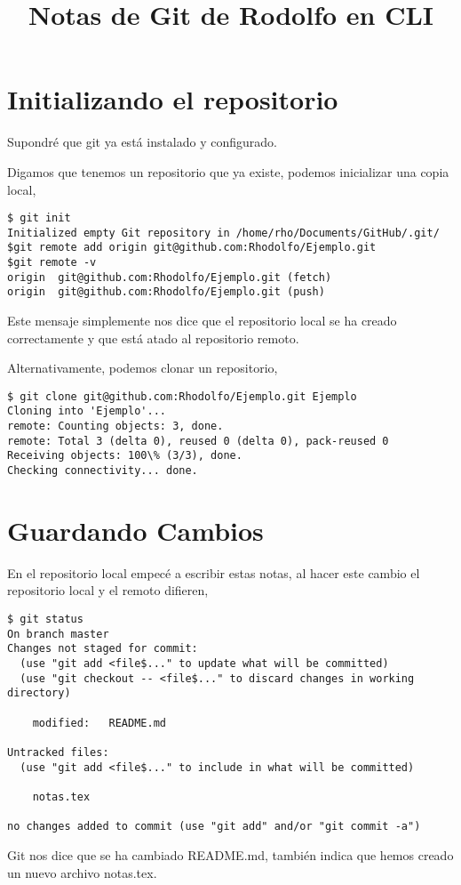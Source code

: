 \documentclass{article}
\begin{document}
\title{Notas de Git de Rodolfo en CLI}
\maketitle

\section{Initializando el repositorio}

Supondr\'{e} que git ya est\'{a} instalado y configurado.

Digamos que tenemos un repositorio que ya existe, 
podemos inicializar una copia local,
\begin{verbatim}
$ git init
Initialized empty Git repository in /home/rho/Documents/GitHub/.git/
$git remote add origin git@github.com:Rhodolfo/Ejemplo.git
$git remote -v
origin	git@github.com:Rhodolfo/Ejemplo.git (fetch)
origin	git@github.com:Rhodolfo/Ejemplo.git (push)
\end{verbatim}
Este mensaje simplemente nos dice que el repositorio local se ha creado correctamente
y que est\'{a} atado al repositorio remoto.

Alternativamente, podemos clonar un repositorio,
\begin{verbatim}
$ git clone git@github.com:Rhodolfo/Ejemplo.git Ejemplo
Cloning into 'Ejemplo'...
remote: Counting objects: 3, done.
remote: Total 3 (delta 0), reused 0 (delta 0), pack-reused 0
Receiving objects: 100\% (3/3), done.
Checking connectivity... done.
\end{verbatim}


\section{Guardando Cambios}

En el repositorio local empec\'{e} a escribir estas notas,
al hacer este cambio el repositorio local y el remoto difieren,
\begin{verbatim}
$ git status
On branch master
Changes not staged for commit:
  (use "git add <file$..." to update what will be committed)
  (use "git checkout -- <file$..." to discard changes in working directory)

	modified:   README.md

Untracked files:
  (use "git add <file$..." to include in what will be committed)

	notas.tex

no changes added to commit (use "git add" and/or "git commit -a")
\end{verbatim}
Git nos dice que se ha cambiado README.md,
tambi\'{e}n indica que hemos creado un nuevo archivo notas.tex.
\end{document}
